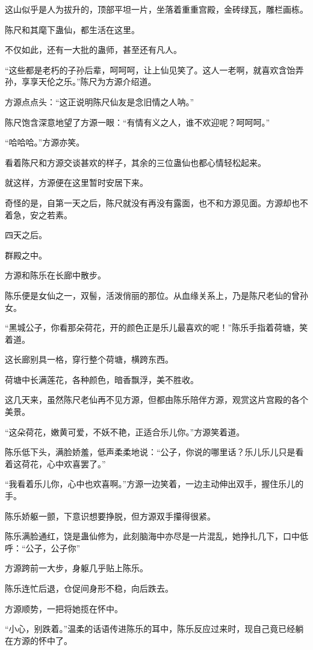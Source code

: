 \begin{this_body}
这山似乎是人为拔升的，顶部平坦一片，坐落着重重宫殿，金砖绿瓦，雕栏画栋。

陈尺和其麾下蛊仙，都生活在这里。

不仅如此，还有一大批的蛊师，甚至还有凡人。

“这些都是老朽的子孙后辈，呵呵呵，让上仙见笑了。这人一老啊，就喜欢含饴弄孙，享享天伦之乐。”陈尺为方源介绍道。

方源点点头：“这正说明陈尺仙友是念旧情之人呐。”

陈尺饱含深意地望了方源一眼：“有情有义之人，谁不欢迎呢？呵呵呵。”

“哈哈哈。”方源亦笑。

看着陈尺和方源交谈甚欢的样子，其余的三位蛊仙也都心情轻松起来。

就这样，方源便在这里暂时安居下来。

奇怪的是，自第一天之后，陈尺就没有再没有露面，也不和方源见面。方源却也不着急，安之若素。

四天之后。

群殿之中。

方源和陈乐在长廊中散步。

陈乐便是女仙之一，双髻，活泼俏丽的那位。从血缘关系上，乃是陈尺老仙的曾孙女。

“黑城公子，你看那朵荷花，开的颜色正是乐儿最喜欢的呢！”陈乐手指着荷塘，笑着道。

这长廊别具一格，穿行整个荷塘，横跨东西。

荷塘中长满莲花，各种颜色，暗香飘浮，美不胜收。

这几天来，虽然陈尺老仙再不见方源，但都由陈乐陪伴方源，观赏这片宫殿的各个美景。

“这朵荷花，嫩黄可爱，不妖不艳，正适合乐儿你。”方源笑着道。

陈乐低下头，满脸娇羞，低声柔柔地说：“公子，你说的哪里话？乐儿乐儿只是看着这荷花，心中欢喜罢了。”

“我看着乐儿你，心中也欢喜啊。”方源一边笑着，一边主动伸出双手，握住乐儿的手。

陈乐娇躯一颤，下意识想要挣脱，但方源双手攥得很紧。

陈乐满脸通红，饶是蛊仙修为，此刻脑海中亦尽是一片混乱，她挣扎几下，口中低呼：“公子，公子你”

方源跨前一大步，身躯几乎贴上陈乐。

陈乐连忙后退，仓促间身形不稳，向后跌去。

方源顺势，一把将她揽在怀中。

“小心，别跌着。”温柔的话语传进陈乐的耳中，陈乐反应过来时，现自己竟已经躺在方源的怀中了。


\end{this_body}
